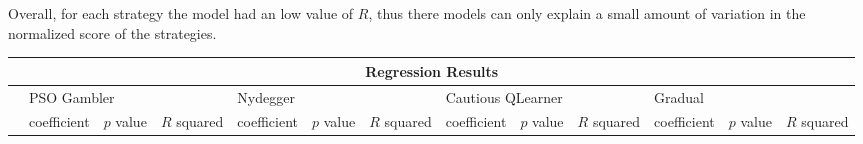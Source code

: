 Overall, for each strategy the model had an low value of \(R\), thus there models
can only explain a small amount of variation in the normalized score of the strategies.
\begin{table}[!hbtp]
	\centering
	\begin{adjustbox}{width=1\textwidth, height=0.2\textwidth}
		\small
		\begin{tabular}{|l|l|l|l|l|l|l|l|l|l|l|l|l|}
			\toprule
			\multicolumn{13}{|c|}{\textbf{Regression Results}}                                                                       \\ \hline
			& \multicolumn{3}{l|}{PSO Gambler} & \multicolumn{3}{l|}{Nydegger} & \multicolumn{3}{l|}{Cautious QLearner} & \multicolumn{3}{l|}{Gradual} \\ \hline
			                           & coefficient  & \(p\) value & \(R\) squared & coefficient & \(p\) value & \(R\) squared & coefficient & \(p\) value & \(R\) squared & coefficient     & \(p\) value & \(R\) squared \\ \hline


\end{tabular}
\end{adjustbox}
\end{table}
